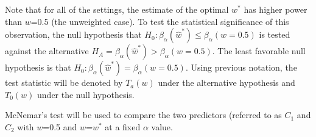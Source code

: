 \documentclass[11pt]{article} %
\begin{document}

Note that  for all of the settings, the estimate of the optimal $w^{*}$ has  higher power than $w$=0.5 (the unweighted case).
To test the statistical significance of this observation,   the null hypothesis that  $H_{0}: \beta_{\alpha}({\hat{w}^*})\leq\beta_{\alpha}({w=0.5})$  is tested against the alternative $H_{A}=\beta_{\alpha}({\hat{w}^*})>\beta_{\alpha}({w=0.5})$.  The least favorable null hypothesis is that  $H_{0}: \beta_{\alpha}({\hat{w}^*})=\beta_{\alpha}({w=0.5})$.
Using previous notation,  the test statistic will be denoted by $T_a(w)$ under the alternative hypothesis and $T_0(w)$ under the null hypothesis.

McNemar's test will be used to compare the two predictors (referred to as $C_1$ and $C_2$ with $w$=0.5 and $w$=$w^*$ at a fixed $\alpha$ value.
\end{document}
